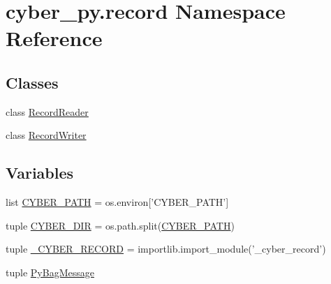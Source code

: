 \hypertarget{namespacecyber__py_1_1record}{\section{cyber\-\_\-py.\-record Namespace Reference}
\label{namespacecyber__py_1_1record}
}
\subsection*{Classes}
\begin{DoxyCompactItemize}
\item 
class \hyperlink{classcyber__py_1_1record_1_1RecordReader}{Record\-Reader}
\item 
class \hyperlink{classcyber__py_1_1record_1_1RecordWriter}{Record\-Writer}
\end{DoxyCompactItemize}
\subsection*{Variables}
\begin{DoxyCompactItemize}
\item 
list \hyperlink{namespacecyber__py_1_1record_a6c55a0934d295d6dcc470358cd211d0e}{C\-Y\-B\-E\-R\-\_\-\-P\-A\-T\-H} = os.\-environ\mbox{[}'C\-Y\-B\-E\-R\-\_\-\-P\-A\-T\-H'\mbox{]}
\item 
tuple \hyperlink{namespacecyber__py_1_1record_a4323c7b4cd51c5ede88eb2e0be39777c}{C\-Y\-B\-E\-R\-\_\-\-D\-I\-R} = os.\-path.\-split(\hyperlink{namespacecyber__py_1_1record_a6c55a0934d295d6dcc470358cd211d0e}{C\-Y\-B\-E\-R\-\_\-\-P\-A\-T\-H})
\item 
tuple \hyperlink{namespacecyber__py_1_1record_ac65574da5ad067a81b20c676bfa06920}{\-\_\-\-C\-Y\-B\-E\-R\-\_\-\-R\-E\-C\-O\-R\-D} = importlib.\-import\-\_\-module('\-\_\-cyber\-\_\-record')
\item 
tuple \hyperlink{namespacecyber__py_1_1record_a98b1a8de6dbf0dd9149a7c83db60d880}{Py\-Bag\-Message}
\end{DoxyCompactItemize}


